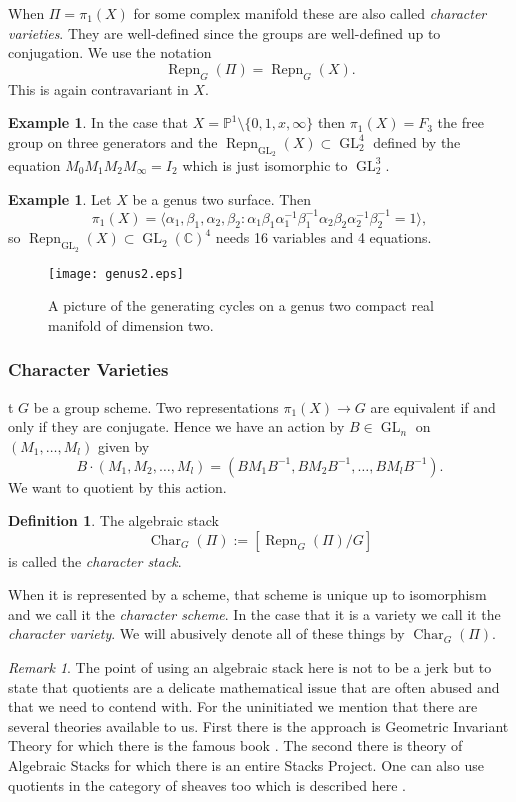 \documentclass[12pt]{book}
\numberwithin{equation}{section}
\theoremstyle{definition}
\newtheorem{definition}[theorem]{Definition}
\newtheorem{example}[theorem]{Example}
\theoremstyle{remark}
\newtheorem{remark}[theorem]{Remark}
\newcommand{\CC}{\mathbb{C}}
\newcommand{\PP}{\mathbb{P}}
\newcommand{\GL}{\operatorname{GL}}
\newcommand{\Repn}{\operatorname{Repn}}
\newcommand{\Char}{\operatorname{Char}}
\begin{document}
When $\Pi=\pi_1(X)$ for some complex manifold these are also called \emph{character varieties}. They are well-defined since the groups are well-defined up to conjugation. 
We use the notation
$$\Repn_G(\Pi) = \Repn_G(X).$$ 
This is again contravariant in $X$. 

\begin{example}
	In the case that $X=\PP^1\setminus \lbrace 0,1,x,\infty\rbrace$ then $\pi_1(X)=F_3$ the free group on three generators and the $\Repn_{\GL_2}(X) \subset \GL_2^4$ defined by the equation $M_0M_1M_2M_{\infty}=I_2$ which is just isomorphic to $\GL_2^3$.
\end{example}


\begin{example}
	Let $X$ be a genus two surface. 
	Then
	$$\pi_1(X) = \langle \alpha_1,\beta_1,\alpha_2,\beta_2 \colon \alpha_1\beta_1\alpha_1^{-1}\beta_1^{-1}\alpha_2\beta_2\alpha_2^{-1}\beta_2^{-1}=1\rangle,$$
	so $\Repn_{\GL_2}(X)\subset \GL_2(\CC)^4$ needs 16 variables and 4 equations. 
	\begin{figure}[h]
		\begin{center}
			\texttt{[image: genus2.eps]}
		\end{center}
		\caption{A picture of the generating cycles on a genus two compact real manifold of dimension two.}
	\end{figure}
\end{example}

\subsubsection{Character Varieties}

t $G$ be a group scheme.
Two representations $\pi_1(X) \to G$ are equivalent if and only if they are conjugate. 
Hence we have an action by $B\in\GL_n$ on $(M_1,\ldots,M_l)$ given by 
$$ B\cdot (M_1,M_2,\ldots,M_l) = (B M_1 B^{-1}, BM_2B^{-1},\ldots, BM_lB^{-1}). $$
We want to quotient by this action.
\begin{definition}
	The algebraic stack 
	$$\Char_{G}(\Pi) := [\Repn_{G}(\Pi)/G]$$ 
	is called the \emph{character stack}.
\end{definition}
When it is represented by a scheme, that scheme is unique up to isomorphism and we call it the \emph{character scheme}. 
In the case that it is a variety we call it the \emph{character variety}. 
We will abusively denote all of these things by $\Char_{G}(\Pi)$.

\begin{remark}
	The point of using an algebraic stack here is not to be a jerk but to state that quotients are a delicate mathematical issue that are often abused and that we need to contend with.
	For the uninitiated we mention that there are several theories available to us. 
	First there is the approach is Geometric Invariant Theory for which there is the famous book \cite{Mumford1994}. 
	The second there is theory of Algebraic Stacks for which there is an entire Stacks Project. 
	One can also use quotients in the category of sheaves too which is described here \cite[\href{https://stacks.math.columbia.edu/tag/07S5}{Tag 07S5}]{stacks-project}.
\end{remark}
\end{document}
